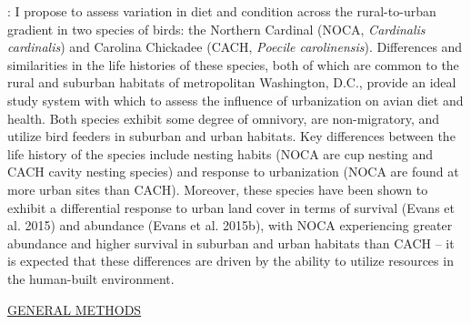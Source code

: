 \documentclass[12pt]{article}
\begin{document}

: I propose to assess variation in diet and condition across the rural-to-urban gradient in two species of birds: the Northern Cardinal (NOCA, \textit{Cardinalis cardinalis}) and Carolina Chickadee (CACH, \textit{Poecile carolinensis}). Differences and similarities in the life histories of these species, both of which are common to the rural and suburban habitats of metropolitan Washington, D.C., provide an ideal study system with which to assess the influence of urbanization on avian diet and health. Both species exhibit some degree of omnivory, are non-migratory, and utilize bird feeders in suburban and urban habitats. Key differences between the life history of the species include nesting habits (NOCA are cup nesting and CACH cavity nesting species) and response to urbanization (NOCA are found at more urban sites than CACH). Moreover, these species have been shown to exhibit a differential response to urban land cover in terms of survival (Evans et al. 2015) and abundance (Evans et al. 2015b), with NOCA experiencing greater abundance and higher survival in suburban and urban habitats than CACH -- it is expected that these differences are driven by the ability to utilize resources in the human-built environment.


\noindent \underline{GENERAL METHODS}\par
\end{document}
